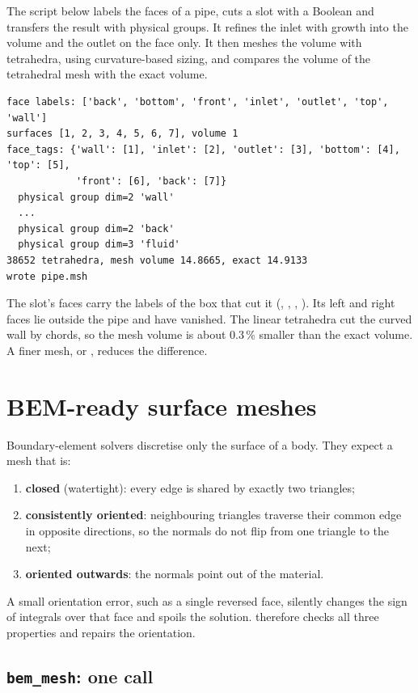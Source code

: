 The script below labels the faces of a pipe, cuts a slot with a Boolean and transfers the
result with physical groups. It refines the inlet with growth into the volume and the outlet
on the face only. It then meshes the volume with tetrahedra, using curvature-based sizing, and
compares the volume of the tetrahedral mesh with the exact volume.


\begin{lstlisting}[style=text]
face labels: ['back', 'bottom', 'front', 'inlet', 'outlet', 'top', 'wall']
surfaces [1, 2, 3, 4, 5, 6, 7], volume 1
face_tags: {'wall': [1], 'inlet': [2], 'outlet': [3], 'bottom': [4], 'top': [5],
            'front': [6], 'back': [7]}
  physical group dim=2 'wall'
  ...
  physical group dim=2 'back'
  physical group dim=3 'fluid'
38652 tetrahedra, mesh volume 14.8665, exact 14.9133
wrote pipe.msh
\end{lstlisting}

The slot's faces carry the labels of the box that cut it (, ,
, ). Its left and right faces lie outside the pipe and have vanished.
The linear tetrahedra cut the curved wall by chords, so the mesh volume is about 0.3\,\%
smaller than the exact volume. A finer mesh, or , reduces the difference.

\section{BEM-ready surface meshes}\label{sec:mesh-bem}

Boundary-element solvers discretise only the surface of a body. They expect a mesh that is:
\begin{enumerate}
  \item \textbf{closed} (watertight): every edge is shared by exactly two triangles;
  \item \textbf{consistently oriented}: neighbouring triangles traverse their common edge in
    opposite directions, so the normals do not flip from one triangle to the next;
  \item \textbf{oriented outwards}: the normals point out of the material.
\end{enumerate}
A small orientation error, such as a single reversed face, silently changes the sign of
integrals over that face and spoils the solution. \NF{} therefore checks all three properties
and repairs the orientation.

\subsection{\texttt{bem\_mesh}: one call}

